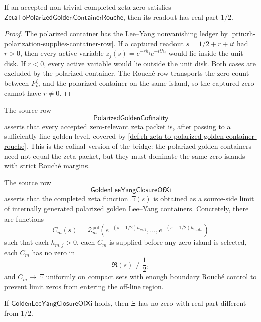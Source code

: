 \begin{theorem}
\label{thm:rh-polarized-golden-capture-fixed-half-readout}
If an accepted non-trivial completed zeta zero satisfies
$\mathsf{ZetaToPolarizedGoldenContainerRouche}$, then its readout has
real part $1/2$.
\end{theorem}

\begin{proof}
The polarized container has the Lee--Yang nonvanishing ledger by
\autoref{prin:rh-polarization-supplies-container-row}.  If a captured
readout $s=1/2+r+it$ had $r>0$, then every active variable
$z_j(s)=e^{-rh_j}e^{-ith_j}$ would lie inside the unit disk.  If
$r<0$, every active variable would lie outside the unit disk.  Both
cases are excluded by the polarized container.  The Rouch\'e row
transports the zero count between $P_m^{\zeta}$ and the polarized
container on the same island, so the captured zero cannot have
$r\ne0$.
\end{proof}

\begin{definition}
\label{def:rh-polarized-golden-cofinality}
The source row
$$
\mathsf{PolarizedGoldenCofinality}
$$
asserts that every accepted zero-relevant zeta packet is, after passing
to a sufficiently fine golden level, covered by
\autoref{def:rh-zeta-to-polarized-golden-container-rouche}.  This is the
cofinal version of the bridge: the polarized golden containers need not
equal the zeta packet, but they must dominate the same zero islands with
strict Rouch\'e margins.
\end{definition}

\begin{definition}
\label{def:rh-source-side-golden-lee-yang-closure}
The source row
$$
\mathsf{GoldenLeeYangClosureOfXi}
$$
asserts that the completed zeta function $\Xi(s)$ is obtained as a
source-side limit of internally generated polarized golden Lee--Yang
containers.  Concretely, there are functions
$$
C_m(s)
=
\mathcal Z_m^{\mathrm{pol}}
\left(
e^{-(s-1/2)h_{m,1}},
\ldots,
e^{-(s-1/2)h_{m,d_m}}
\right)
$$
such that each $h_{m,j}>0$, each $C_m$ is supplied before any zero
island is selected, each $C_m$ has no zero in
$$
\Re(s)\ne\frac12,
$$
and $C_m\to\Xi$ uniformly on compact sets with enough boundary
Rouch\'e control to prevent limit zeros from entering the off-line
region.
\end{definition}

\begin{theorem}
\label{thm:rh-golden-lee-yang-closure-fixed-half-readout}
If $\mathsf{GoldenLeeYangClosureOfXi}$ holds, then $\Xi$ has no zero
with real part different from $1/2$.
\end{theorem}

